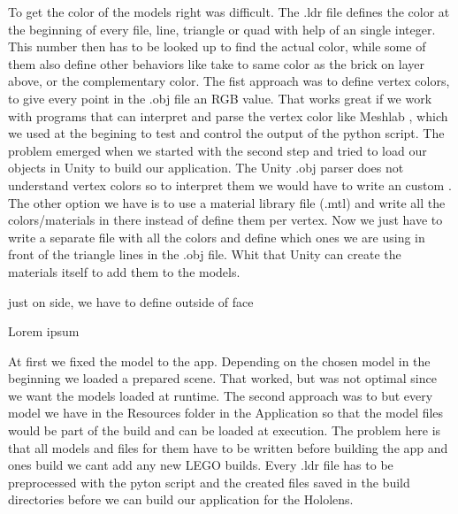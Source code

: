 \documentclass[11pt,a4paper]{article}
\begin{document}
\begin{description}[align=left]
		\item [Color] 
		To get the color of the models right was difficult. The .ldr file defines the color at the beginning of every file, line, triangle or quad with help of an single integer. This number then has to be looked up to find the actual color, while some of them also define other behaviors like take to same color as the brick on layer above, or the complementary color. The fist approach was to define vertex colors, to give every point in the .obj file an RGB value. That works great if we work with programs that can interpret and parse the vertex color like Meshlab , which we used at the begining to test and control the output of the python script. The problem emerged when we started with the second step and tried to load our objects in Unity to build our application. The Unity .obj parser does not understand vertex colors so to interpret them we would have to write an custom . The other option we have is to use a material library file (.mtl) and write all the colors/materials in there instead of define them per vertex. Now we just have to write a separate file with all the colors and define which ones we are using in front of the triangle lines in the .obj file. Whit that Unity can create the materials itself to add them to the models.
		
		\item [Shading]
		just on side, we have to define outside of face
		
		\item [Lightning]
		Lorem ipsum  
		
		\item [Runtime parsing]
		At first we fixed the model to the app. Depending on the chosen model in the beginning we loaded a prepared scene. That worked, but was not optimal since we want the models loaded at runtime. The second approach was to but every model we have in the Resources folder in the Application so that the model files would be part of the build and can be loaded at execution. The problem here is that all models and files for them have to be written before building the app and ones build we cant add any new LEGO builds. Every .ldr file has to be preprocessed with the pyton script and the created files saved in the build directories before we can build our application for the Hololens.
		

\end{description}
\end{document}

